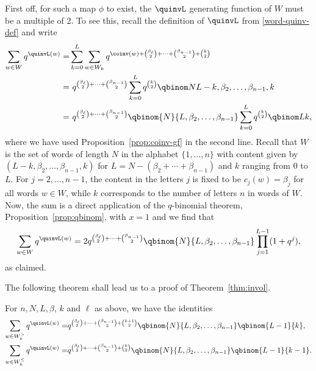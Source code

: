 First off, for such a map $\phi$ to exist, the $\quinvL$ generating function of $W$ must be a multiple
of 2. To see this, recall the definition of $\quinvL$ from \eqref{word-quinv-def} and write
\begin{align*}
\sum_{w \in W} q^{\quinvL(w)} =& \sum_{k=0}^L \sum_{w \in W_k} q^{\coinv(w) + \binom{\beta_\ell}{2} + \cdots + \binom{\beta_{n-1}}{2} + \binom{k}{2} } \\
=&\ q^{\binom{\beta_\ell}{2} + \cdots + \binom{\beta_{n-1}}{2}} \sum_{k=0}^L q^{\binom{k}{2}} \qbinom N{L-k,\beta_2,\dots, \beta_{n-1},k} \\
=&\ q^{\binom{\beta_\ell}{2} + \cdots + \binom{\beta_{n-1}}{2}} \qbinom{N}{L,\beta_2,\dots,\beta_{n-1}} \sum_{k=0}^L q^{\binom{k}{2}} \qbinom Lk,
\end{align*}
where we have used Proposition~\ref{prop:coinv-gf} in the second line. Recall that $W$ is the set of words of length $N$ in the alphabet $\{1,\ldots,n\}$ with content given by $(L-k,\beta_2,\ldots,\beta_{n-1},k)$ for $L=N-(\beta_2+\cdots+\beta_{n-1})$ and $k$ ranging from $0$ to $L$. For $j=2,\ldots,n-1$, the content in the letters $j$ is fixed to be $c_j(w)=\beta_j$ for all words $w\in W$, while $k$ corresponds to the number of letters $n$ in words of $W$. Now, the sum is a direct application 
of the $q$-binomial theorem, Proposition~\ref{prop:qbinom}, with $x=1$ and we find that
\[
\sum_{w \in W} q^{\quinvL(w)} = 2 q^{\binom{\beta_\ell}{2} + \cdots + \binom{\beta_{n-1}}{2}}  \qbinom{N}{L,\beta_2,\dots,\beta_{n-1}} \prod_{j=1}^{L-1} (1 + q^j),
\]
as claimed.

The following theorem shall lead us to a proof of Theorem~\ref{thm:invol}.

\begin{theorem}
\label{thm:quinv-gf}
For $n, N, L, \beta$, $k$ and $\ell$ as above, we have the identities
\begin{align}
\label{quinv-gf>}
\sum_{w \in W_k^>} q^{\quinvL(w)} =& q^{\binom{\beta_\ell}{2} + \cdots + \binom{\beta_{n-1}}{2} + \binom{k+1}{2}} \qbinom{N}{L,\beta_2,\dots,\beta_{n-1}} \qbinom{L-1}{k}, \\
\label{quinv-gf<}
\sum_{w \in W_k^\leq} q^{\quinvL(w)} =& q^{\binom{\beta_\ell}{2} + \cdots + \binom{\beta_{n-1}}{2} + \binom{k}{2}} \qbinom{N}{L,\beta_2,\dots,\beta_{n-1}} \qbinom{L-1}{k-1}.
\end{align}
\end{theorem}


